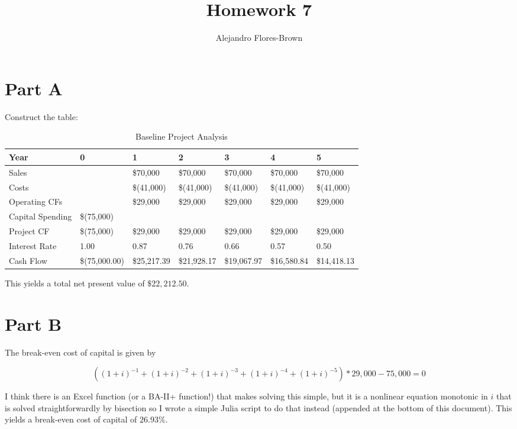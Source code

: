 \documentclass[12pt, letterpaper, parskip = full]{article}
\title{Homework 7}
\author{Alejandro Flores-Brown}
\begin{document}
	\maketitle

    \section{Part A}

    Construct the table:

    \begin{table}[!ht]
    \centering
    \caption{Baseline Project Analysis}
    \begin{tabularx}{\textwidth}{|X|X|X|X|X|X|X|}
    \hline
        Year & 0 & 1 & 2 & 3 & 4 & 5 \\ \hline
        Sales & ~ &  \$70,000  &  \$70,000  &  \$70,000  &  \$70,000  &  \$70,000 \\ \hline
        Costs & ~ &  \$(41,000) &  \$(41,000) &  \$(41,000) &  \$(41,000) &  \$(41,000) \\ \hline
        Operating CFs & ~ &  \$29,000  &  \$29,000  &  \$29,000  &  \$29,000  &  \$29,000 \\ \hline
        Capital Spending &  \$(75,000) & ~ & ~ & ~ & ~ & ~ \\ \hline
        Project CF &  \$(75,000) &  \$29,000  &  \$29,000  &  \$29,000  &  \$29,000  &  \$29,000 \\ \hline
        Interest Rate &  1.00  &  0.87  &  0.76  &  0.66  &  0.57  &  0.50 \\ \hline
        Cash Flow &  \$(75,000.00) &  \$25,217.39  &  \$21,928.17  &  \$19,067.97  &  \$16,580.84  &  \$14,418.13 \\ \hline
    \end{tabularx}
\end{table}

This yields a total net present value of \(\$22,212.50\).

\section{Part B}

The break-even cost of capital is given by

\[ \left( (1+i)^{-1} + (1+i)^{-2} + (1+i)^{-3} + (1+i)^{-4} + (1+i)^{-5} \right) * 29,000 - 75,000 = 0 \]

I think there is an Excel function (or a BA-II+ function!) that makes solving this simple, but it is a nonlinear equation monotonic in \(i\) that is solved straightforwardly by bisection so I wrote a simple Julia script to do that instead (appended at the bottom of this document). This yields a break-even cost of capital of \(26.93\%\). 
\end{document}
